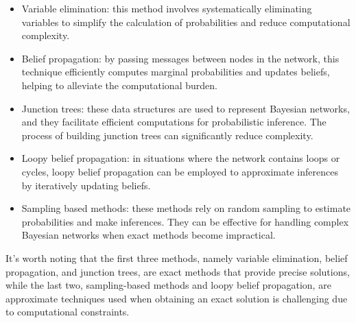\documentclass[12pt, a4paper]{report}
\begin{document}
    \begin{itemize}
        \item Variable elimination: this method involves systematically eliminating variables to simplify the calculation of probabilities and reduce computational complexity.
        \item Belief propagation: by passing messages between nodes in the network, this technique efficiently computes marginal probabilities and updates beliefs, helping to alleviate the computational burden.
        \item Junction trees: these data structures are used to represent Bayesian networks, and they facilitate efficient computations for probabilistic inference. 
            The process of building junction trees can significantly reduce complexity.
        \item Loopy belief propagation: in situations where the network contains loops or cycles, loopy belief propagation can be employed to approximate inferences by iteratively updating beliefs.
        \item Sampling based methods: these methods rely on random sampling to estimate probabilities and make inferences. 
            They can be effective for handling complex Bayesian networks when exact methods become impractical.
    \end{itemize}
    It's worth noting that the first three methods, namely variable elimination, belief propagation, and junction trees, are exact methods that provide precise solutions, while the last two, sampling-based methods and loopy belief propagation, are approximate techniques used when obtaining an exact solution is challenging due to computational constraints.
\end{document}
